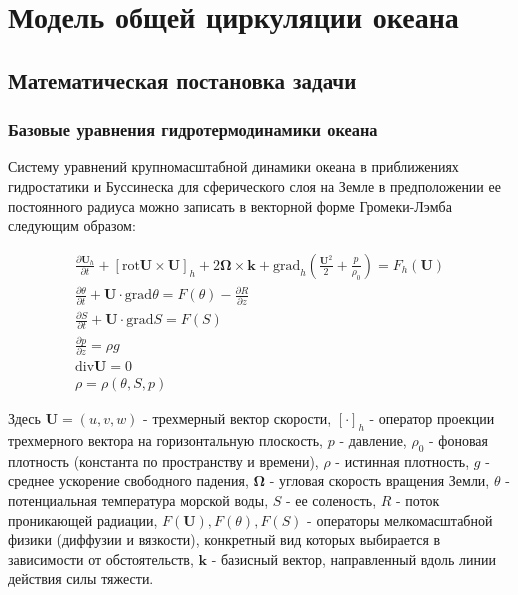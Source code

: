 \chapter{Модель общей циркуляции океана}\label{ch:inmsom/ch1}

\section{Математическая постановка задачи}\label{sec:inmsom/ch1/sec1}

\subsection{Базовые уравнения гидротермодинамики океана}
    Систему уравнений крупномасштабной динамики океана в приближениях гидростатики и Буссинеска для сферического слоя на Земле в предположении ее постоянного радиуса можно записать в векторной форме Громеки-Лэмба следующим образом:
		
	\begin{equation} \label{eq:inmsom/1} 
	\begin{array}{c} 
	\displaystyle{\frac{\partial \textbf{U}_h }{\partial t_{} } +\left[\mbox{rot}\textbf{U}\times \textbf{U}\right]_{h} +2 \mathbf{ \Omega } \times \textbf{k}+ \mbox{grad}_{h} \left(\frac{\textbf{U}^{2} }{2^{} } + \frac{p_{} }{\rho _{0} } \right)=F_{h} (\textbf{U})} \\ 
	
	\displaystyle{\frac{\partial \theta }{\partial t} +\textbf{U}\cdot \mbox{grad}\theta =F(\theta )-\frac{\partial R}{\partial z} } \\ 
	
	\displaystyle{\frac{\partial S}{\partial t} + \textbf{U}\cdot \mbox{grad}S=F(S)} \\ 
	
	\displaystyle{\frac{\partial p}{\partial z} =\rho g} \\ 
	
	\displaystyle{\mbox{div} \textbf{U}=0} \\ 
	
	\displaystyle{\rho =\rho (\theta ,S,p)} 
	\end{array} 
	\end{equation} 
	
	Здесь $\textbf{U} = (u, v, w)$ - трехмерный вектор скорости, $[\cdot]_h$ - оператор проекции трехмерного вектора на
	горизонтальную плоскость, $p$ - давление, $\rho_0$ - фоновая плотность (константа по пространству и времени),
	$\rho$ - истинная плотность, $g$ - среднее ускорение свободного падения,
	$\mathbf{ \Omega} $ - угловая скорость вращения Земли, $\theta$ - потенциальная температура морской воды, $S$ - ее соленость,
	$R$ - поток проникающей радиации, $F(\textbf{U}), F(\theta), F(S)$ - операторы мелкомасштабной физики (диффузии и вязкости), конкретный вид
	которых выбирается в зависимости от обстоятельств, $\textbf{k}$ - базисный вектор, направленный вдоль линии действия силы тяжести.
	
